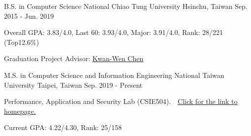 

\begin{cventries}

\cventry
    {B.S. in Computer Science} %
    {National Chiao Tung University} %
    {Hsinchu, Taiwan} %
    {Sep. 2015 - Jun. 2019} %
    {
      \begin{cvitems} %
        \item {Overall GPA: 3.83/4.0, Last 60: 3.93/4.0, Major: 3.91/4.0, Rank: 28/221 (Top12.6\%)}
        \item {Graduation Project Advisor: \href{https://www.cs.nctu.edu.tw/members/detail/kuanwen}{Kwan-Wen Chen}}
      \end{cvitems}
    }
    
\cventry
    {M.S. in Computer Science and Information Engineering} %
    {National Taiwan University} %
    {Taipei, Taiwan} %
    {Sep. 2019 - Present} %
    {
      \begin{cvitems} %
        \item {Performance, Application and Security Lab (CSIE504).\ \    \href{https://hungsh-ntucsie.blogspot.com/p/blog-page_2668.html}{\uline{Click for the link to homepage.}}}
        \item {Current GPA: 4.22/4.30, Rank: 25/158}
      \end{cvitems}
    }
\end{cventries}
